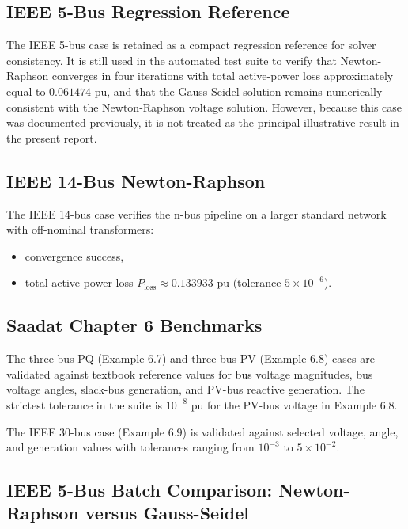\documentclass[12pt,a4paper]{article}
\begin{document}
\subsection{IEEE 5-Bus Regression Reference}

The IEEE 5-bus case is retained as a compact regression reference for solver consistency. It is still used in the automated test suite to verify that Newton-Raphson converges in four iterations with total active-power loss approximately equal to \(0.061474\) pu, and that the Gauss-Seidel solution remains numerically consistent with the Newton-Raphson voltage solution. However, because this case was documented previously, it is not treated as the principal illustrative result in the present report.

\subsection{IEEE 14-Bus Newton-Raphson}

The IEEE 14-bus case verifies the n-bus pipeline on a larger standard network with off-nominal transformers:
\begin{itemize}[leftmargin=1.5em]
    \item convergence success,
    \item total active power loss $P_{\text{loss}} \approx \mathbf{0.133933}$ pu (tolerance $5 \times 10^{-6}$).
\end{itemize}

\subsection{Saadat Chapter 6 Benchmarks}

The three-bus PQ (Example 6.7) and three-bus PV (Example 6.8) cases are validated against textbook reference values for bus voltage magnitudes, bus voltage angles, slack-bus generation, and PV-bus reactive generation. The strictest tolerance in the suite is \(10^{-8}\) pu for the PV-bus voltage in Example 6.8.

The IEEE 30-bus case (Example 6.9) is validated against selected voltage, angle, and generation values with tolerances ranging from $10^{-3}$ to $5 \times 10^{-2}$.

\subsection{IEEE 5-Bus Batch Comparison: Newton-Raphson versus Gauss-Seidel}
\end{document}

